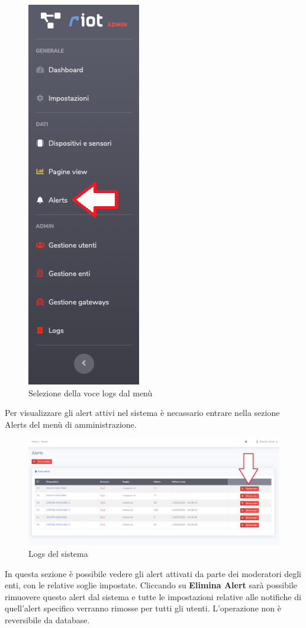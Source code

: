 	\begin{figure}[H]
		\centering
		\includegraphics[scale=0.600]{res/images/admin/menuAlerts.png}
		\caption{Selezione della voce logs dal menù}
	\end{figure}

		Per visualizzare gli alert attivi nel sistema è necassario entrare nella sezione Alerts del menù di amministrazione.

	\begin{figure}[H]
		\centering
		\includegraphics[scale=0.600]{res/images/admin/elimAlert.png}
		\caption{Logs del sistema}
	\end{figure}

	In questa sezione è possibile vedere gli alert attivati da parte dei moderatori degli enti, con le relative soglie impostate. Cliccando su \textbf{Elimina Alert} sarà possibile rimuovere questo alert dal sistema e tutte le impostazioni relative alle notifiche di quell'alert specifico verranno rimosse per tutti gli utenti. L'operazione non è reversibile da database. 
